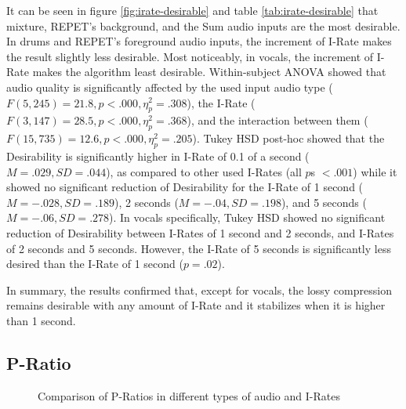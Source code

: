 It can be seen in figure \ref{fig:irate-desirable} and table \ref{tab:irate-desirable} that mixture, REPET's background, and the Sum audio inputs are the most desirable.
In drums and REPET's foreground audio inputs, the increment of I-Rate makes the result slightly less desirable.
Most noticeably, in vocals, the increment of I-Rate makes the algorithm least desirable.
Within-subject ANOVA showed that audio quality is significantly affected by the used input audio type ($F(5,245)=21.8, p<.000, \eta_{p}^{2}=.308$), the I-Rate ($F(3,147)=28.5, p<.000, \eta_{p}^{2}=.368$), and the interaction between them ($F(15,735)=12.6, p<.000, \eta_{p}^{2}=.205$).
Tukey HSD post-hoc showed that the Desirability is significantly higher in I-Rate of 0.1 of a second ($M=.029, SD=.044$), as compared to other used I-Rates (all $p$s $<.001$) while it showed no significant reduction of Desirability for the I-Rate of 1 second ($M=-.028, SD=.189$), 2 seconds ($M=-.04, SD=.198$), and 5 seconds ($M=-.06, SD=.278$). In vocals specifically, Tukey HSD showed no significant reduction of Desirability between I-Rates of 1 second and 2 seconds, and I-Rates of 2 seconds and 5 seconds. However, the I-Rate of 5 seconds is significantly less desired than the I-Rate of 1 second ($p=.02$).

In summary, the results confirmed that, except for vocals, the lossy compression remains desirable with any amount of I-Rate and it stabilizes when it is higher than 1 second.

\subsection{P-Ratio}

\begin{figure}[ht]
  
  \caption{Comparison of P-Ratios in different types of audio and I-Rates}
  \label{fig:irate-pratio}
\end{figure}

